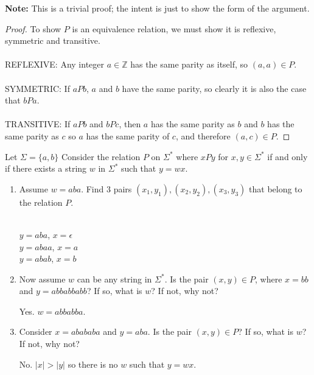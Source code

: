 \documentclass[]{exam}
\theoremstyle{definition}
\newcommand{\bb}[1]{\mathbb{#1}}
\newcommand{\Z}{\bb{Z}}
\begin{document}
\begin{questions}
\begin{solution}
\textbf{Note:} This is a trivial proof; the intent is just to show the form of the
  argument.
\begin{proof}
To show $P$ is an equivalence relation, we must show it is reflexive, symmetric
and transitive.
\\~\\
REFLEXIVE: Any integer $a \in \Z$ has the same parity as itself, so $(a,a) \in
P$.
\\~\\
SYMMETRIC: If $aPb$, $a$ and $b$ have the same parity, so clearly it is also the
case that $bPa$.
\\~\\
TRANSITIVE: If $aPb$ and $bPc$, then $a$ has the same parity as $b$ and $b$ has
the same parity as $c$ so $a$ has the same parity of $c$, and therefore $(a,c)
\in P$. 
\end{proof}

\end{solution}

\question
Let $\Sigma = \{a,b\}$
Consider the relation $P$ on $\Sigma^*$ where $xPy$ for $x,y \in \Sigma^*$
if and only if there exists a string $w$ in $\Sigma^*$ such that $y = wx$. 
\begin{enumerate}[label=\alph*)]
\item Assume $w = aba$. Find $3$ pairs $(x_1,y_1),(x_2,y_2),(x_3,y_3)$ that belong
to the relation $P$.
\begin{solution}~\\
$y = aba$, $x = \epsilon$\\
$y = abaa$, $x = a$\\
$y = abab$, $x = b$\\
\end{solution}

\item Now assume $w$ can be any string in $\Sigma^*$. Is the pair $(x,y) \in P$,
where $x = bb$ and $y = abbabbabb$? If so, what is $w$? If not, why
not?
\begin{solution}
Yes. $w = abbabba$.
\end{solution}

\item Consider $x = abababa$ and $y = aba$. Is the pair $(x,y) \in P$? If so,
what is $w$? If not, why not?
\begin{solution}
No. $|x| > |y|$ so there is no $w$ such that $y = wx$.
\end{solution}


\end{enumerate}
\end{questions}
\end{document}
